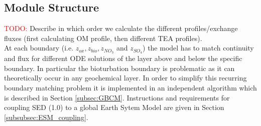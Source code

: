 \documentclass[gmd, manuscript]{copernicus}
\begin{document}
\subsection{Module Structure}
\textcolor{red}{TODO: }
Describe in which order we calculate the different profiles/exchange fluxes (first calculating OM profile, then different TEA profiles).\\ 
At each boundary (i.e. $z_{ox}, z_{bio}, z_{NO_3}$ and $z_{SO_4}$) the model has to match continuity and flux for different ODE solutions of the layer above and below the specific boundary. 
In particular the bioturbation boundary is problematic as it can theoretically occur in any geochemical layer. In order to simplify this recurring boundary matching problem it is implemented in an independent algorithm 
which is described in Section \ref{subsec:GBCM}. Instructions and requirements for coupling SED (1.0) to a global Earth Sytem Model are given in Section \ref{subsubsec:ESM_coupling}.
\end{document}
